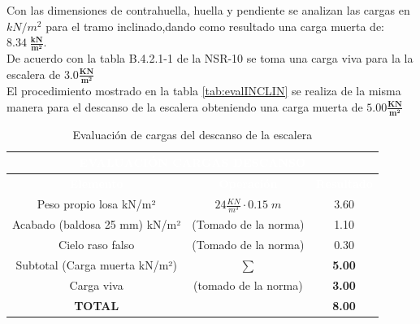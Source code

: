 \documentclass[12pt]{article}
\begin{document}
Con las dimensiones de contrahuella, huella y pendiente se analizan las cargas en $kN/m^2$ para el tramo inclinado,dando como resultado una carga muerta de: $\mathbf{8.34\; \tfrac{kN}{m^2}}$.\\

De acuerdo con la tabla B.4.2.1-1 de la NSR-10 se toma una carga viva para la la escalera de  $\mathbf{3.0 \tfrac{KN}{m^2}}$ \\

El procedimiento mostrado en la tabla \ref{tab:evalINCLIN} se realiza de la misma manera para el descanso de la escalera obteniendo una carga muerta de $\mathbf{5.00\tfrac{KN}{m^2}}$ 

\begin{table}[H]
\centering

\begin{tabular}{|c|c|c|} 
\hline
\multicolumn{3}{|c|}{{\cellcolor[rgb]{ .2,  .247,  .31}}\textcolor{white}{\textbf{EVALUACIÓN CARGAS DESCANSO}}}                                        \\ 
\hline
\rowcolor[rgb]{ .2,  .247,  .31} \textcolor{white}{\textbf{Elemento}} & \textcolor{white}{\textbf{Operación}} & \textcolor{white}{\textbf{Resultado}}  \\ 
\hline
{\cellcolor[rgb]{1,1,1}}Peso propio losa
  kN/m²        & $24\tfrac{KN}{m^3} \cdot 0.15\;m$                                     & 3.60                                   \\ 
\hline
{\cellcolor[rgb]{1,1,1}}Acabado (baldosa 25
  mm) kN/m² & (Tomado de la norma)                                     & 1.10                                   \\ 
\hline
{\cellcolor[rgb]{1,1,1}}Cielo raso falso                    & (Tomado de la norma)                                       & 0.30                                   \\ 
\hline
{\cellcolor[rgb]{1,1,1}}Subtotal (Carga
  muerta kN/m²) & $\mathbf{\sum}$                                     & \textbf{5.00 }                                  \\ 
\hline
{\cellcolor[rgb]{1,1,1}}Carga viva                      & (tomado de la norma)                                     & \textbf{3.00  }                                 \\ 
\hline
{\cellcolor[rgb]{1,1,1}}\textbf{TOTAL}                  & ~                                     & \textbf{8.00   }                                \\
\hline
\end{tabular}
\caption{Evaluación de cargas del descanso de la escalera }
\label{tab:Evaldescanso}
\end{table}
\end{document}
